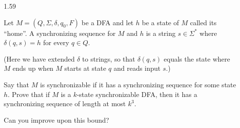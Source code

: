 \begin{enumerate}
      \item [1.59]
            
            Let $M = (Q,\Sigma, \delta, q_0, F)$ be a DFA and let $h$ be a state of $M$ called its “home”. A synchronizing sequence for $M$ and $h$ is a string $s \in \Sigma^\ast$ where $\delta(q,s)=h$ for every $q \in Q$. 
            
            (Here we have extended $\delta$ to strings, so that $\delta(q,s)$ equals the state where $M$ ends up when $M$ starts at state $q$ and reads input $s$.) 
            
            Say that $M$ is synchronizable if it has a synchronizing sequence for some state $h$. Prove that if $M$ is a $k$-state synchronizable DFA, then it has a synchronizing sequence of length at most $k^3$. 
            
            Can you improve upon this bound?
            
\end{enumerate}
